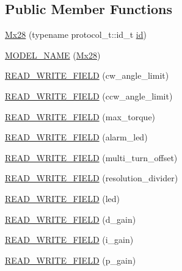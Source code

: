 \subsection*{Public Member Functions}
\begin{DoxyCompactItemize}
\item 
\hyperlink{classdynamixel_1_1servos_1_1_mx28_adea4ede69354101076170e0dca3803e8}{Mx28} (typename protocol\+\_\+t\+::id\+\_\+t \hyperlink{classdynamixel_1_1servos_1_1_servo_a2d022081672e25a7bb57b76706e1cc57}{id})
\item 
\hyperlink{classdynamixel_1_1servos_1_1_mx28_a449582e6be4e876dfd3c2fc8baebfe0c}{M\+O\+D\+E\+L\+\_\+\+N\+A\+ME} (\hyperlink{classdynamixel_1_1servos_1_1_mx28}{Mx28})
\item 
\hyperlink{classdynamixel_1_1servos_1_1_mx28_a72f7fd07e8b1eba0510fdfa419982d8e}{R\+E\+A\+D\+\_\+\+W\+R\+I\+T\+E\+\_\+\+F\+I\+E\+LD} (cw\+\_\+angle\+\_\+limit)
\item 
\hyperlink{classdynamixel_1_1servos_1_1_mx28_a7740c7fbf924f2a8798c73825e567a6b}{R\+E\+A\+D\+\_\+\+W\+R\+I\+T\+E\+\_\+\+F\+I\+E\+LD} (ccw\+\_\+angle\+\_\+limit)
\item 
\hyperlink{classdynamixel_1_1servos_1_1_mx28_a5943a81e2bd8182b0e179dfc82c0dd49}{R\+E\+A\+D\+\_\+\+W\+R\+I\+T\+E\+\_\+\+F\+I\+E\+LD} (max\+\_\+torque)
\item 
\hyperlink{classdynamixel_1_1servos_1_1_mx28_a9eed46d4353a9632a01d68dc58efff3c}{R\+E\+A\+D\+\_\+\+W\+R\+I\+T\+E\+\_\+\+F\+I\+E\+LD} (alarm\+\_\+led)
\item 
\hyperlink{classdynamixel_1_1servos_1_1_mx28_a46e2d0d30ec2eec94632fcac0482db83}{R\+E\+A\+D\+\_\+\+W\+R\+I\+T\+E\+\_\+\+F\+I\+E\+LD} (multi\+\_\+turn\+\_\+offset)
\item 
\hyperlink{classdynamixel_1_1servos_1_1_mx28_a434dfc6ab2c93bc6d64deaa1935b65e9}{R\+E\+A\+D\+\_\+\+W\+R\+I\+T\+E\+\_\+\+F\+I\+E\+LD} (resolution\+\_\+divider)
\item 
\hyperlink{classdynamixel_1_1servos_1_1_mx28_a31456611718e8d0e42bebf682988f498}{R\+E\+A\+D\+\_\+\+W\+R\+I\+T\+E\+\_\+\+F\+I\+E\+LD} (led)
\item 
\hyperlink{classdynamixel_1_1servos_1_1_mx28_a52a0e732b934d5945a31adb2d61c027b}{R\+E\+A\+D\+\_\+\+W\+R\+I\+T\+E\+\_\+\+F\+I\+E\+LD} (d\+\_\+gain)
\item 
\hyperlink{classdynamixel_1_1servos_1_1_mx28_ade3fdfa957647a81eb799b4ab10329d3}{R\+E\+A\+D\+\_\+\+W\+R\+I\+T\+E\+\_\+\+F\+I\+E\+LD} (i\+\_\+gain)
\item 
\hyperlink{classdynamixel_1_1servos_1_1_mx28_a0b47071e1333fcab8d171a84bf55e2a8}{R\+E\+A\+D\+\_\+\+W\+R\+I\+T\+E\+\_\+\+F\+I\+E\+LD} (p\+\_\+gain)

\end{DoxyCompactItemize}
